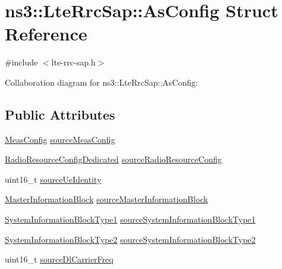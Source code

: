 \hypertarget{structns3_1_1LteRrcSap_1_1AsConfig}{}\section{ns3\+:\+:Lte\+Rrc\+Sap\+:\+:As\+Config Struct Reference}
\label{structns3_1_1LteRrcSap_1_1AsConfig}


{\ttfamily \#include $<$lte-\/rrc-\/sap.\+h$>$}



Collaboration diagram for ns3\+:\+:Lte\+Rrc\+Sap\+:\+:As\+Config\+:
\subsection*{Public Attributes}
\begin{DoxyCompactItemize}
\item 
\hyperlink{structns3_1_1LteRrcSap_1_1MeasConfig}{Meas\+Config} \hyperlink{structns3_1_1LteRrcSap_1_1AsConfig_a2ce82c6247fc2469637bd9b31104dcf5}{source\+Meas\+Config}
\item 
\hyperlink{structns3_1_1LteRrcSap_1_1RadioResourceConfigDedicated}{Radio\+Resource\+Config\+Dedicated} \hyperlink{structns3_1_1LteRrcSap_1_1AsConfig_a09d460adcf96fabdd6f3c493f36bf876}{source\+Radio\+Resource\+Config}
\item 
uint16\+\_\+t \hyperlink{structns3_1_1LteRrcSap_1_1AsConfig_a29f8fddb659f258d7250a35282cc85ca}{source\+Ue\+Identity}
\item 
\hyperlink{structns3_1_1LteRrcSap_1_1MasterInformationBlock}{Master\+Information\+Block} \hyperlink{structns3_1_1LteRrcSap_1_1AsConfig_a1588aaf39ff0a8898119529aec23d94a}{source\+Master\+Information\+Block}
\item 
\hyperlink{structns3_1_1LteRrcSap_1_1SystemInformationBlockType1}{System\+Information\+Block\+Type1} \hyperlink{structns3_1_1LteRrcSap_1_1AsConfig_a5de40852fd35dbeeb19990a23ccf0a66}{source\+System\+Information\+Block\+Type1}
\item 
\hyperlink{structns3_1_1LteRrcSap_1_1SystemInformationBlockType2}{System\+Information\+Block\+Type2} \hyperlink{structns3_1_1LteRrcSap_1_1AsConfig_aaf68e6c66f6f3e8230a4f2dd720875a7}{source\+System\+Information\+Block\+Type2}
\item 
uint16\+\_\+t \hyperlink{structns3_1_1LteRrcSap_1_1AsConfig_ad69c57a616c9e8dba2cf6f1248c4eae3}{source\+Dl\+Carrier\+Freq}
\end{DoxyCompactItemize}


